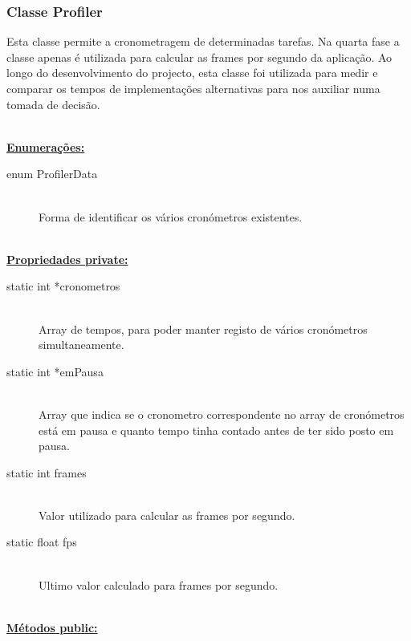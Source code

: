 \documentclass[a5paper,onecolumn, 11pt]{article}
\begin{document}
\clearpage
\subsubsection{Classe Profiler} \label{clsse profiler}
Esta classe permite a cronometragem de determinadas tarefas. Na quarta fase a classe apenas é utilizada para calcular as frames por segundo da aplicação. Ao longo do desenvolvimento do projecto, esta classe foi utilizada para medir e comparar os tempos de implementações alternativas para nos auxiliar numa tomada de decisão.

\hfill \\ \underline{\textbf{Enumerações:}}

\begin{description}
	\item[enum ProfilerData] \hfill \\
	Forma de identificar os vários cronómetros existentes.
\end{description}

\hfill \\ \underline{\textbf{Propriedades private:}}

\begin{description}
	\item[static int *cronometros] \hfill \\
	Array de tempos, para poder manter registo de vários cronómetros simultaneamente.

	\item[static int *emPausa] \hfill \\
	Array que indica se o cronometro correspondente no array de cronómetros está em pausa e quanto tempo tinha contado antes de ter sido posto em pausa.

	\item[static int frames] \hfill \\
	Valor utilizado para calcular as frames por segundo.

	\item[static float fps] \hfill \\
	Ultimo valor calculado para frames por segundo.
\end{description}

\hfill \\ \underline{\textbf{Métodos public:}}
\end{document}
